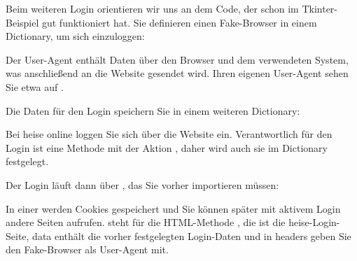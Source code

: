 \medskip
    

    
\medskip
    
Beim weiteren Login orientieren wir uns an dem Code, der schon im Tkinter-Beispiel gut funktioniert hat. Sie definieren einen Fake-Browser in einem Dictionary, um sich einzuloggen:

\medskip
    

\medskip    

Der User-Agent enthält Daten über den Browser und dem verwendeten System, was anschließend an die Website gesendet wird. Ihren eigenen User-Agent sehen Sie etwa auf .
    
Die Daten für den Login speichern Sie in einem weiteren Dictionary:

\medskip
    
    
\medskip
    
Bei heise online loggen Sie sich über die Website  ein. Verantwortlich für den Login ist eine Methode  mit der Aktion , daher wird auch sie im Dictionary festgelegt.
    
Der Login läuft dann über , das Sie vorher importieren müssen:

\medskip
    
    
\PYTHON{}


\medskip

In einer  werden Cookies gespeichert und Sie können später mit aktivem Login andere Seiten aufrufen.  steht für die HTML-Methode , die  ist die heise-Login-Seite, data enthält die vorher festgelegten Login-Daten und in headers geben Sie den Fake-Browser als User-Agent mit.
    
